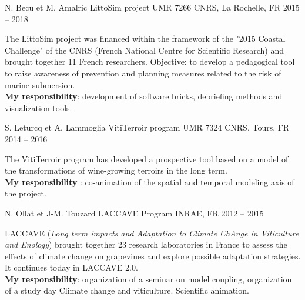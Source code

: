 \begin{cventries}
  \cventry
  {N. Becu et M. Amalric} %
  {LittoSim project} %
  {UMR 7266 CNRS, La Rochelle, FR} %
  {2015 -- 2018} %
  {
    \begin{cvitems} %
      The LittoSim project was financed within the framework of the "2015 Coastal Challenge" of the CNRS (French National Centre for Scientific Research) and brought together 11 French researchers. Objective: to develop a pedagogical tool to raise awareness of prevention and planning measures related to the risk of marine submersion.\\
      \textbf{My responsibility}: development of software bricks, debriefing methods and visualization tools.
    \end{cvitems}
    }


\cventry
{S. Leturcq et A. Lammoglia} %
{VitiTerroir program} %
{UMR 7324 CNRS, Tours, FR} %
{2014 -- 2016} %
{
  \begin{cvitems} %
    The VitiTerroir program has developed a prospective tool based on a model of the transformations of wine-growing terroirs in the long term.\\
    \textbf{My responsibility} : co-animation of the spatial and temporal modeling axis of the project.
  \end{cvitems}
}

\cventry
{N. Ollat et J-M. Touzard} %
{LACCAVE Program} %
{INRAE, FR} %
{2012 -- 2015} %
{
  \begin{cvitems} %
  LACCAVE (\emph{Long term impacts and Adaptation to Climate ChAnge in Viticulture and Enology}) brought together 23 research laboratories in France to assess the effects of climate change on grapevines and explore possible adaptation strategies. It continues today in LACCAVE 2.0.\\
  \textbf{My responsibility}: organization of a seminar on model coupling, organization of a study day Climate change and viticulture. Scientific animation.
  \end{cvitems}
}


\end{cventries}
